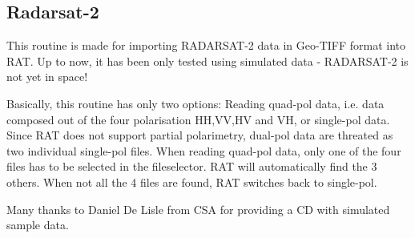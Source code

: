 \subsection{Radarsat-2}
This routine is made for importing RADARSAT-2 data in Geo-TIFF format into RAT.
Up to now, it has been only tested using simulated data - RADARSAT-2 is not yet
in space!

Basically, this routine has only two options: Reading quad-pol data, i.e. data
composed out of the four polarisation HH,VV,HV and VH, or single-pol data. Since
RAT does not support partial polarimetry, dual-pol data are threated as two
individual single-pol files. When reading quad-pol data, only one of the four files
has to be selected in the fileselector. RAT will automatically find the 3 others.
When not all the 4 files are found, RAT switches back to single-pol.

Many thanks to Daniel De Lisle from CSA for providing a CD with simulated sample
data.
